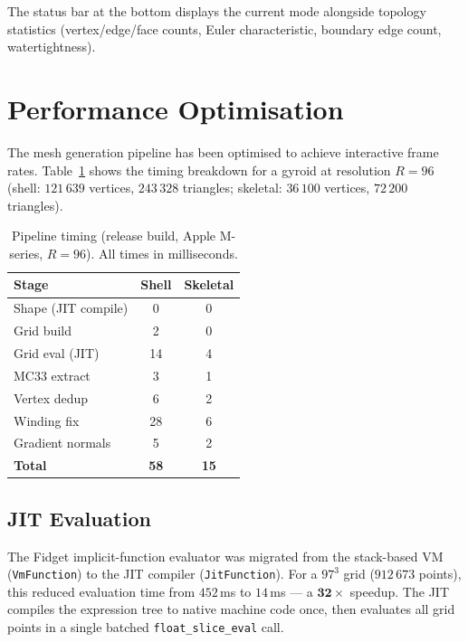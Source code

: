 \documentclass[11pt]{article}
\begin{document}
The status bar at the bottom displays the current mode alongside
topology statistics (vertex/edge/face counts, Euler characteristic,
boundary edge count, watertightness).

\section{Performance Optimisation}\label{sec:perf}

The mesh generation pipeline has been optimised to achieve interactive
frame rates.  Table~\ref{tab:perf} shows the timing breakdown for a
gyroid at resolution $R=96$ (shell: $121\,639$ vertices, $243\,328$
triangles; skeletal: $36\,100$ vertices, $72\,200$ triangles).

\begin{table}[h]
\centering
\caption{Pipeline timing (release build, Apple M-series, $R=96$).
All times in milliseconds.}
\label{tab:perf}
\begin{tabular}{lcc}
\toprule
Stage & Shell & Skeletal \\
\midrule
Shape (JIT compile)   & 0    & 0  \\
Grid build            & 2    & 0  \\
Grid eval (JIT)       & 14   & 4  \\
MC33 extract          & 3    & 1  \\
Vertex dedup          & 6    & 2  \\
Winding fix           & 28   & 6  \\
Gradient normals      & 5    & 2  \\
\midrule
\textbf{Total}        & \textbf{58} & \textbf{15} \\
\bottomrule
\end{tabular}
\end{table}

\subsection{JIT Evaluation}\label{sec:jit}

The Fidget implicit-function evaluator was migrated from the
stack-based VM (\texttt{VmFunction}) to the JIT compiler
(\texttt{JitFunction}).  For a $97^3$ grid ($912\,673$ points), this
reduced evaluation time from $452$\,ms to $14$\,ms --- a
$\mathbf{32\times}$ speedup.  The JIT compiles the expression tree to
native machine code once, then evaluates all grid points in a single
batched \texttt{float\_slice\_eval} call.
\end{document}
